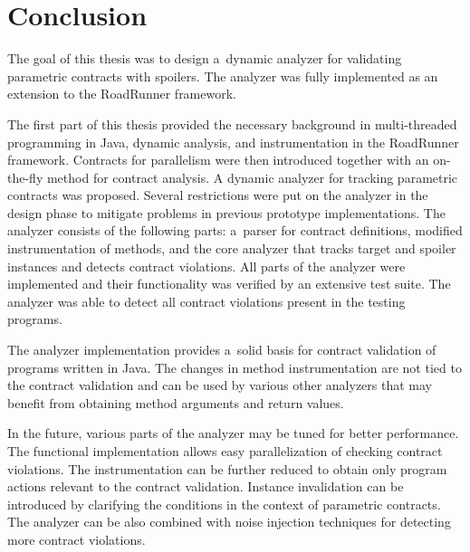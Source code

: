 \chapter{Conclusion}

The goal of this thesis was to design a~dynamic analyzer for validating
parametric contracts with spoilers. The analyzer was fully implemented as an
extension to the RoadRunner framework.

The first part of this thesis provided the necessary background in
multi-threaded programming in Java, dynamic analysis, and instrumentation in the
RoadRunner framework. Contracts for parallelism were then introduced together
with an on-the-fly method for contract analysis. A dynamic analyzer for tracking
parametric contracts was proposed. Several restrictions were put on the analyzer
in the design phase to mitigate problems in previous prototype implementations.
The analyzer consists of the following parts: a~parser for contract definitions,
modified instrumentation of methods, and the core analyzer that tracks target
and spoiler instances and detects contract violations. All parts of the analyzer
were implemented and their functionality was verified by an extensive test
suite. The analyzer was able to detect all contract violations present in the
testing programs.

The analyzer implementation provides a~solid basis for contract validation of
programs written in Java. The changes in method instrumentation are not tied to
the contract validation and can be used by various other analyzers that may
benefit from obtaining method arguments and return values.

In the future, various parts of the analyzer may be tuned for better
performance. The functional implementation allows easy parallelization of
checking contract violations. The instrumentation can be further reduced to
obtain only program actions relevant to the contract validation. Instance
invalidation can be introduced by clarifying the conditions in the context of
parametric contracts. The analyzer can be also combined with noise injection
techniques for detecting more contract violations.
